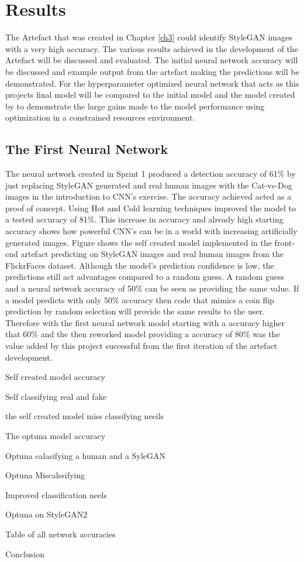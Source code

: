\chapter{Results}

The Artefact that was created in Chapter \ref{ch3} could identify StyleGAN images with a very high accuracy. The various results achieved in the development of the Artefact will be discussed and evaluated. The initial neural network accuracy will be discussed and example output from the artefact making the predictions will be demonstrated. For the hyperparameter optimized neural network that acts as this projects final model will be compared to the initial model and the model created by \cite{Wang} to demonstrate the large gains made to the model performance using optimization in a constrained resources environment. 

\section{The First Neural Network}

The neural network created in Sprint 1 produced a detection accuracy of 61\% by just replacing StyleGAN generated and real human images with the Cat-vs-Dog images in the introduction to CNN's exercise. The accuracy achieved acted as a proof of concept. Using Hot and Cold learning techniques improved the model to a tested accuracy of 81\%. This increase in accuracy and already high starting accuracy shows how powerful CNN's can be in a world with increasing artificially generated images. Figure shows the self created model implemented in the front-end artefact predicting on StyleGAN images and real human images from the FlickrFaces dataset. Although the model's prediction confidence is low, the predictions still act advantages compared to a random guess. A random guess and a neural network accuracy of 50\% can be seen as providing the same value. If a model predicts with only 50\% accuracy then code that mimics a coin flip prediction by random selection will provide the same results to the user. Therefore with the first neural network model starting with a accuracy higher that 60\% and the then reworked model providing a accuracy of 80\% was the value added by this project successful from the first iteration of the artefact development.


Self created model accuracy

Self classifying real and fake

the self created model miss classifying neeils

The optuna model accuracy

Optuna calasifying a human and a SyleGAN

Optuna Miscalssifying

Improved classification neels

Optuna on StyleGAN2

Table of all network accuracies

Conclusion
